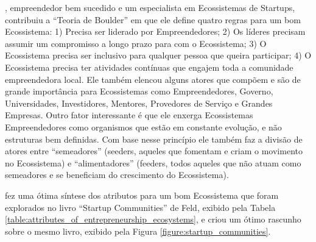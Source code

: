 , empreendedor bem sucedido e um especialista em Ecossistemas de Startups, contribuiu a ``Teoria de Boulder'' em que ele define quatro regras para um bom Ecossistema: 1) Precisa ser liderado por Empreendedores; 2) Os líderes precisam assumir um compromisso a longo prazo para com o Ecossistema; 3) O Ecossistema precisa ser inclusivo para qualquer pessoa que queira participar; 4) O Ecossistema precisa ter atividades contínuas que engajem toda a comunidade empreendedora local. Ele também elencou alguns atores que compõem e são de grande importância para Ecossistemas como Empreendedores, Governo, Universidades, Investidores, Mentores, Provedores de Serviço e Grandes Empresas. Outro fator interessante é que ele enxerga Ecossistemas Empreendedores como organismos que estão em constante evolução, e não estruturas bem definidas. Com base nesse princípio ele também faz a divisão de atores entre ``semeadores'' (seeders, aqueles que fomentam e criam o movimento no Ecossistema) e ``alimentadores'' (feeders, todos aqueles que não atuam como semeadores e se beneficiam do crescimento do Ecossistema). 

 fez uma ótima síntese dos atributos para um bom Ecossistema que foram explorados no livro ``Startup Communities'' de Feld, exibido pela Tabela \ref{table:attributes_of_entrepreneurship_ecosystems}, e  criou um ótimo rascunho sobre o mesmo livro, exibido pela Figura \ref{figure:startup_communities}.

